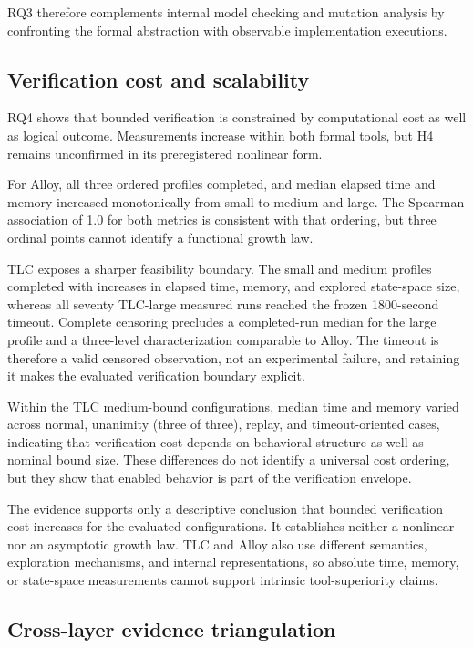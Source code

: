 RQ3 therefore complements internal model checking and mutation analysis by
confronting the formal abstraction with observable implementation executions.

\subsection{Verification cost and scalability}
\label{subsec:discussion-cost}

RQ4 shows that bounded verification is constrained by computational cost as
well as logical outcome. Measurements increase within both formal tools, but
H4 remains unconfirmed in its preregistered nonlinear form.

For Alloy, all three ordered profiles completed, and median elapsed time and
memory increased monotonically from small to medium and large. The Spearman
association of 1.0 for both metrics is consistent with that ordering, but three
ordinal points cannot identify a functional growth law.

TLC exposes a sharper feasibility boundary. The small and medium profiles
completed with increases in elapsed time, memory, and explored state-space size,
whereas all seventy TLC-large measured runs reached the frozen 1800-second
timeout. Complete censoring precludes a completed-run median for the large
profile and a three-level characterization comparable to Alloy. The timeout is
therefore a valid censored observation, not an experimental failure, and
retaining it makes the evaluated verification boundary explicit.

Within the TLC medium-bound configurations, median time and memory varied
across normal, unanimity (three of three), replay, and
timeout-oriented cases, indicating that verification cost depends on behavioral
structure as well as nominal bound size. These differences do not identify a
universal cost ordering, but they show that enabled behavior is part of the
verification envelope.

The evidence supports only a descriptive conclusion that bounded verification
cost increases for the evaluated configurations. It establishes neither a
nonlinear nor an asymptotic growth law. TLC and Alloy also use different
semantics, exploration mechanisms, and internal representations, so absolute
time, memory, or state-space measurements cannot support intrinsic
tool-superiority claims.

\subsection{Cross-layer evidence triangulation}
\label{subsec:discussion-triangulation}

